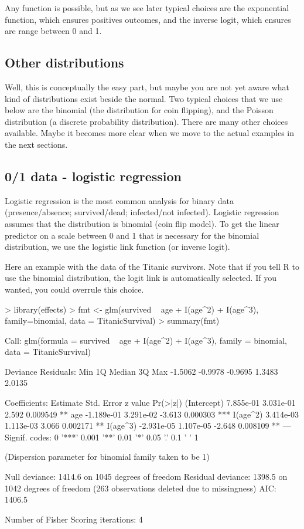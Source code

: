 \documentclass[a4paper,twoside]{tufte-book} %
\begin{document}
Any function is possible, but as we see later typical choices are the exponential function, which ensures positives outcomes, and the inverse logit, which ensures are range between 0 and 1.

\subsection{Other distributions}

Well, this is conceptually the easy part, but maybe you are not yet aware what kind of distributions exist beside the normal. Two typical choices that we use below are the binomial (the distribution for coin flipping), and the Poisson distribution (a discrete probability distribution). There are many other choices available. Maybe it becomes more clear when we move to the actual examples in the next sections. 

\subsection{0/1 data - logistic regression}

Logistic regression is the most common analysis for binary data (presence/absence; survived/dead; infected/not infected). Logistic regression assumes that the distribution is binomial (coin flip model). To get the linear predictor on a scale between 0 and 1 that is necessary for the binomial distribution, we use the logistic link function (or inverse logit). 

Here an example with the data of the Titanic survivors. Note that if you tell R to use the binomial distribution, the logit link is automatically selected. If you wanted, you could overrule this choice. 

\begin{Schunk}
\begin{Sinput}
> library(effects)
> fmt <- glm(survived ~ age + I(age^2) + I(age^3), family=binomial, data = TitanicSurvival)
> summary(fmt)
\end{Sinput}
\begin{Soutput}
Call:
glm(formula = survived ~ age + I(age^2) + I(age^3), family = binomial, 
    data = TitanicSurvival)

Deviance Residuals: 
    Min       1Q   Median       3Q      Max  
-1.5062  -0.9978  -0.9695   1.3483   2.0135  

Coefficients:
              Estimate Std. Error z value Pr(>|z|)    
(Intercept)  7.855e-01  3.031e-01   2.592 0.009549 ** 
age         -1.189e-01  3.291e-02  -3.613 0.000303 ***
I(age^2)     3.414e-03  1.113e-03   3.066 0.002171 ** 
I(age^3)    -2.931e-05  1.107e-05  -2.648 0.008109 ** 
---
Signif. codes:  0 '***' 0.001 '**' 0.01 '*' 0.05 '.' 0.1 ' ' 1

(Dispersion parameter for binomial family taken to be 1)

    Null deviance: 1414.6  on 1045  degrees of freedom
Residual deviance: 1398.5  on 1042  degrees of freedom
  (263 observations deleted due to missingness)
AIC: 1406.5

Number of Fisher Scoring iterations: 4
\end{Soutput}
\end{Schunk}
\end{document}
